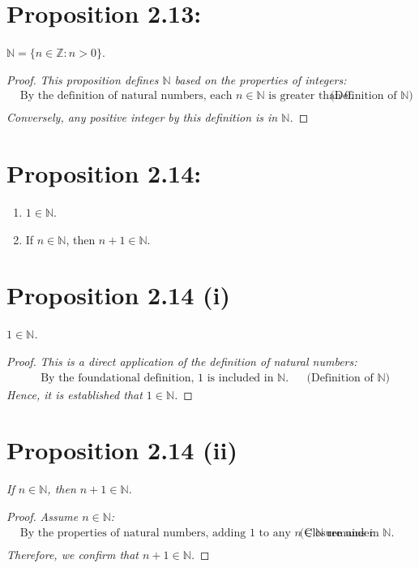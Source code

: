\section*{Proposition 2.13:}
$\mathbb{N} = \{ n \in \mathbb{Z} : n > 0 \}$.
\begin{proof}
    \textit{This proposition defines $\mathbb{N}$ based on the properties of integers:}
    \begin{align*}
        & \text{By the definition of natural numbers, each $n \in \mathbb{N}$ is greater than $0$.} & & \text{(Definition of $\mathbb{N}$)} \\
    \end{align*}
    \textit{Conversely, any positive integer by this definition is in $\mathbb{N}$.}
\end{proof}



\section*{Proposition 2.14:}
\begin{enumerate}[label=(\roman*)]
    \item $1 \in \mathbb{N}$.
    \item If $n \in \mathbb{N}$, then $n+1 \in \mathbb{N}$.
\end{enumerate}
\section*{Proposition 2.14 (i)}
\textit{$1 \in \mathbb{N}$.}
\begin{proof}
    \textit{This is a direct application of the definition of natural numbers:}
    \begin{align*}
        & \text{By the foundational definition, $1$ is included in $\mathbb{N}$.} & & \text{(Definition of $\mathbb{N}$)}
    \end{align*}
    \textit{Hence, it is established that $1 \in \mathbb{N}$.}
\end{proof}

\section*{Proposition 2.14 (ii)}
\textit{If $n \in \mathbb{N}$, then $n+1 \in \mathbb{N}$.}
\begin{proof}
    \textit{Assume $n \in \mathbb{N}$:}
    \begin{align*}
        & \text{By the properties of natural numbers, adding $1$ to any $n \in \mathbb{N}$ remains in $\mathbb{N}$.} & & \text{(Closure under addition, Axiom 2.1(i))} \\
    \end{align*}
    \textit{Therefore, we confirm that $n+1 \in \mathbb{N}$.}
\end{proof}



